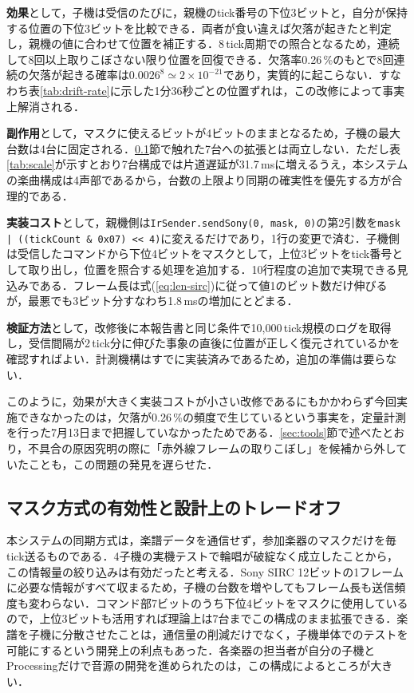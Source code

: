 \documentclass[uplatex,dvipdfmx]{jlreq}
\begin{document}
\textbf{効果}として，子機は受信のたびに，親機のtick番号の下位3ビットと，自分が保持する位置の下位3ビットを比較できる．両者が食い違えば欠落が起きたと判定し，親機の値に合わせて位置を補正する．8\,tick周期での照合となるため，連続して8回以上取りこぼさない限り位置を回復できる．欠落率0.26\,\%のもとで8回連続の欠落が起きる確率は$0.0026^{8} \simeq 2\times10^{-21}$であり，実質的に起こらない．すなわち表\ref{tab:drift-rate}に示した1分36秒ごとの位置ずれは，この改修によって事実上解消される．

\textbf{副作用}として，マスクに使えるビットが4ビットのままとなるため，子機の最大台数は4台に固定される．\ref{sec:disc-mask}節で触れた7台への拡張とは両立しない．ただし表\ref{tab:scale}が示すとおり7台構成では片道遅延が31.7\,msに増えるうえ，本システムの楽曲構成は4声部であるから，台数の上限より同期の確実性を優先する方が合理的である．

\textbf{実装コスト}として，親機側は\texttt{IrSender.sendSony(0, mask, 0)}の第2引数を\texttt{mask | ((tickCount \& 0x07) << 4)}に変えるだけであり，1行の変更で済む．子機側は受信したコマンドから下位4ビットをマスクとして，上位3ビットをtick番号として取り出し，位置を照合する処理を追加する．10行程度の追加で実現できる見込みである．フレーム長は式(\ref{eq:len-sirc})に従って値1のビット数だけ伸びるが，最悪でも3ビット分すなわち1.8\,msの増加にとどまる．

\textbf{検証方法}として，改修後に本報告書と同じ条件で10{,}000\,tick規模のログを取得し，受信間隔が2\,tick分に伸びた事象の直後に位置が正しく復元されているかを確認すればよい．計測機構はすでに実装済みであるため，追加の準備は要らない．

このように，効果が大きく実装コストが小さい改修であるにもかかわらず今回実施できなかったのは，欠落が0.26\,\%の頻度で生じているという事実を，定量計測を行った7月13日まで把握していなかったためである．\ref{sec:tools}節で述べたとおり，不具合の原因究明の際に「赤外線フレームの取りこぼし」を候補から外していたことも，この問題の発見を遅らせた．

\subsection{マスク方式の有効性と設計上のトレードオフ}
\label{sec:disc-mask}

本システムの同期方式は，楽譜データを通信せず，参加楽器のマスクだけを毎tick送るものである．4子機の実機テストで輪唱が破綻なく成立したことから，この情報量の絞り込みは有効だったと考える．Sony SIRC 12ビットの1フレームに必要な情報がすべて収まるため，子機の台数を増やしてもフレーム長も送信頻度も変わらない．コマンド部7ビットのうち下位4ビットをマスクに使用しているので，上位3ビットも活用すれば理論上は7台までこの構成のまま拡張できる．楽譜を子機に分散させたことは，通信量の削減だけでなく，子機単体でのテストを可能にするという開発上の利点もあった．各楽器の担当者が自分の子機とProcessingだけで音源の開発を進められたのは，この構成によるところが大きい\cite{kobayashi2013}．
\end{document}
